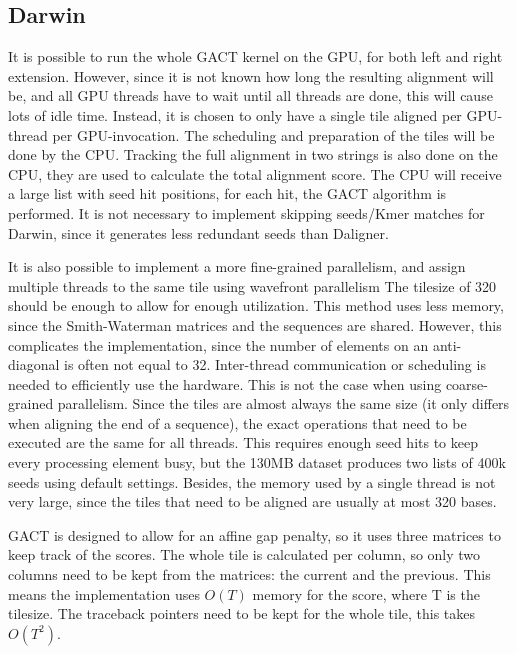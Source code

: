 \documentclass[../main/thesis.tex]{subfiles}
\begin{document}
\subsection{Darwin}
It is possible to run the whole GACT kernel on the GPU, for both left and right extension.
However, since it is not known how long the resulting alignment will be, and all GPU threads have to wait until all threads are done, this will cause lots of idle time.
Instead, it is chosen to only have a single tile aligned per GPU-thread per GPU-invocation.
The scheduling and preparation of the tiles will be done by the CPU.
Tracking the full alignment in two strings is also done on the CPU, they are used to calculate the total alignment score.
The CPU will receive a large list with seed hit positions, for each hit, the GACT algorithm is performed.
It is not necessary to implement skipping seeds/Kmer matches for Darwin, since it generates less redundant seeds than Daligner.



It is also possible to implement a more fine-grained parallelism, and assign multiple threads to the same tile using wavefront parallelism 
The tilesize of 320 should be enough to allow for enough utilization.
This method uses less memory, since the Smith-Waterman matrices and the sequences are shared.
However, this complicates the implementation, since the number of elements on an anti-diagonal is often not equal to 32.
Inter-thread communication or scheduling is needed to efficiently use the hardware.
This is not the case when using coarse-grained parallelism.
Since the tiles are almost always the same size (it only differs when aligning the end of a sequence), the exact operations that need to be executed are the same for all threads.
This requires enough seed hits to keep every processing element busy, but the 130MB dataset produces two lists of 400k seeds using default settings. 
Besides, the memory used by a single thread is not very large, since the tiles that need to be aligned are usually at most 320 bases.

GACT is designed to allow for an affine gap penalty, so it uses three matrices to keep track of the scores.
The whole tile is calculated per column, so only two columns need to be kept from the matrices: the current and the previous.
This means the implementation uses $O(T)$ memory for the score, where T is the tilesize.
The traceback pointers need to be kept for the whole tile, this takes $O(T^2)$.
\end{document}
